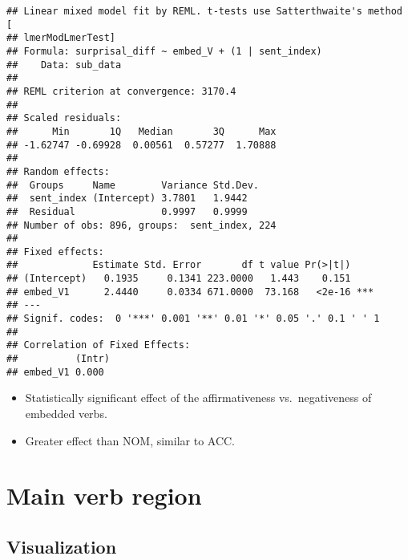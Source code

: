 \documentclass[]{ltjsarticle}
\providecommand{\tightlist}{%
  \setlength{\itemsep}{0pt}\setlength{\parskip}{0pt}}
\begin{document}
\begin{verbatim}
## Linear mixed model fit by REML. t-tests use Satterthwaite's method [
## lmerModLmerTest]
## Formula: surprisal_diff ~ embed_V + (1 | sent_index)
##    Data: sub_data
## 
## REML criterion at convergence: 3170.4
## 
## Scaled residuals: 
##      Min       1Q   Median       3Q      Max 
## -1.62747 -0.69928  0.00561  0.57277  1.70888 
## 
## Random effects:
##  Groups     Name        Variance Std.Dev.
##  sent_index (Intercept) 3.7801   1.9442  
##  Residual               0.9997   0.9999  
## Number of obs: 896, groups:  sent_index, 224
## 
## Fixed effects:
##             Estimate Std. Error       df t value Pr(>|t|)    
## (Intercept)   0.1935     0.1341 223.0000   1.443    0.151    
## embed_V1      2.4440     0.0334 671.0000  73.168   <2e-16 ***
## ---
## Signif. codes:  0 '***' 0.001 '**' 0.01 '*' 0.05 '.' 0.1 ' ' 1
## 
## Correlation of Fixed Effects:
##          (Intr)
## embed_V1 0.000
\end{verbatim}

\begin{itemize}
\tightlist
\item
  Statistically significant effect of the affirmativeness
  vs.~negativeness of embedded verbs.
\item
  Greater effect than NOM, similar to ACC.
\end{itemize}

\section{Main verb region}\label{main-verb-region}

\subsection{Visualization}\label{visualization-1}
\end{document}
